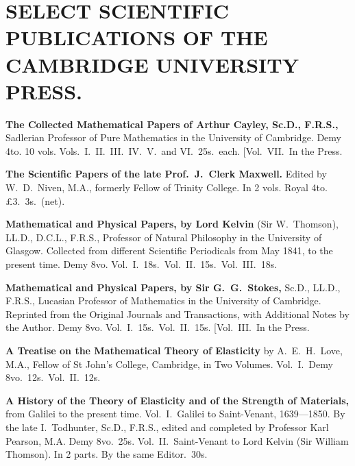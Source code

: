 \documentclass[11pt,a4paper]{article}
\theoremstyle{plain}
\theoremstyle{definition}
\theoremstyle{remark}
\begin{document}
\vfill

\newpage
\setcounter{page}{631}

\section*{SELECT SCIENTIFIC PUBLICATIONS OF THE CAMBRIDGE UNIVERSITY PRESS.}

\smallskip

\noindent\textbf{The Collected Mathematical Papers of Arthur Cayley, Sc.D., F.R.S.,} Sadlerian Professor of Pure Mathematics in the University of Cambridge. Demy 4to. 10 vols. Vols.\ I.\ II.\ III.\ IV.\ V.\ and VI.\ 25s.\ each. [Vol.~VII.\ In the Press.

\smallskip

\noindent\textbf{The Scientific Papers of the late Prof.\ J.\ Clerk Maxwell.} Edited by W.\ D.\ Niven, M.A., formerly Fellow of Trinity College. In 2 vols. Royal 4to. \pounds3.\ 3s.\ (net).

\smallskip

\noindent\textbf{Mathematical and Physical Papers, by Lord Kelvin} (Sir W.\ Thomson), LL.D., D.C.L., F.R.S., Professor of Natural Philosophy in the University of Glasgow. Collected from different Scientific Periodicals from May 1841, to the present time. Demy 8vo. Vol.\ I.\ 18s.\ Vol.\ II.\ 15s.\ Vol.\ III.\ 18s.

\smallskip

\noindent\textbf{Mathematical and Physical Papers, by Sir G.\ G.\ Stokes,} Sc.D., LL.D., F.R.S., Lucasian Professor of Mathematics in the University of Cambridge. Reprinted from the Original Journals and Transactions, with Additional Notes by the Author. Demy 8vo. Vol.\ I.\ 15s.\ Vol.\ II.\ 15s. [Vol.\ III.\ In the Press.

\smallskip

\noindent\textbf{A Treatise on the Mathematical Theory of Elasticity} by A.\ E.\ H.\ Love, M.A., Fellow of St John's College, Cambridge, in Two Volumes. Vol.\ I.\ Demy 8vo.\ 12s.\ Vol.\ II.\ 12s.

\smallskip

\noindent\textbf{A History of the Theory of Elasticity and of the Strength of Materials,} from Galilei to the present time. Vol.\ I.\ Galilei to Saint-Venant, 1639---1850. By the late I.\ Todhunter, Sc.D., F.R.S., edited and completed by Professor Karl Pearson, M.A. Demy 8vo.\ 25s. Vol.\ II.\ Saint-Venant to Lord Kelvin (Sir William Thomson). In 2 parts. By the same Editor.\ 30s.
\end{document}
